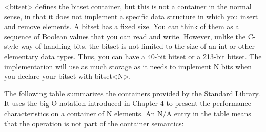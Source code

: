 <bitset> defines the bitset container, but this is not a container in the normal sense, in that it does not implement a specific data structure in which you insert and remove elements. A bitset has a fixed size. You can think of them as a sequence of Boolean values that you can read and write. However, unlike the C-style way of handling bits, the bitset is not limited to the size of an int or other elementary data types. Thus, you can have a 40-bit bitset or a 213-bit bitset. The implementation will use as much storage as it needs to implement N bits when you declare your bitset with bitset<N>.


The following table summarizes the containers provided by the Standard Library. It uses the big-O notation introduced in Chapter 4 to present the performance characteristics on a container of N elements. An N/A entry in the table means that the operation is not part of the container semantics:

